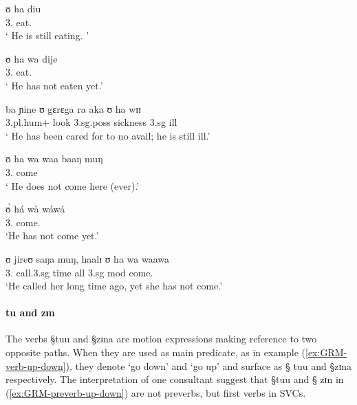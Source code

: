 \begin{exe}
\ex
\begin{xlist}
 

\ex\label{ex:vp32.24}
\gll ʊ ha diu \\
     {3.\sg}  {\mod} eat.\foc  \\
\glt  ` He is still eating. ' 


\ex\label{ex:vp20.3.2.}
\gll ʊ ha wa dije \\
 {3.\sg}  {\mod} {\neg} eat.{\pfv}   \\
\glt  ` He has not eaten yet.'


\ex\label{ex:vp21.2.1.}
\gll ba ɲine ʊ gɛrɛga ra aka ʊ ha wɪɪ \\
 {\sc 3.pl.hum+} look {\sc 3.sg.poss} sickness {\foc} {\conn}  {\sc 3.sg}
{\mod} ill \\
\glt  ` He has been cared for to no avail; he is still ill.' 


\ex\label{ex:vp20.1.1.}
\gll ʊ ha wa waa baaŋ muŋ \\
       {3.\sg} {\mod}  {\neg} come {\dem} {\quant}\\
\glt  `  He does not come here (ever).' 


\ex\label{ex:vp20.3.1.}
\gll ʊ̀ há wà wáwá \\
       {3.\sg} {\mod}   {\neg} come.{\pfv} \\
\glt  `He has not come yet.' 


\ex\label{ex:yet-conn}
\gll ʊ jireʊ saŋa muŋ, haalɪ ʊ ha wa waawa \\
       {3.\sg}  call.{\sc 3.sg} time all {\conn}   {\sc 3.sg} {\sc mod}  {\neg}
come.{\pfv} \\
\glt  `He called her long time ago, yet she has not
come.' 
\end{xlist}
\end{exe}



\paragraph{tu and zɪn}
\label{sec:GRM-preverb-up-down} 

The verbs {\S tuu} and {\S zɪna} are motion
expressions making reference to two opposite paths. When they are used as main
predicate, as in example (\ref{ex:GRM-verb-up-down}),  they denote `go down' and
`go up' and  surface as {\S
tuu} and {\S zɪna} respectively.  The interpretation of one  consultant suggest
that  {\S tuu} and {\S
zɪn} in 
(\ref{ex:GRM-preverb-up-down}) are not preverbs, but first verbs in SVCs.

